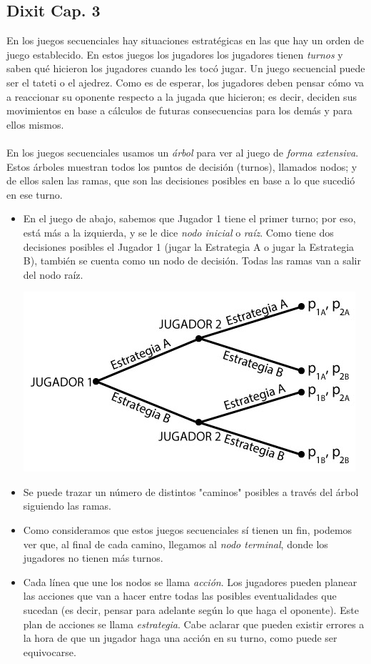 \documentclass{article}
\begin{document}
    \subsection*{\textbf{Dixit Cap. 3}}
        En los juegos secuenciales hay situaciones estratégicas en las que hay un orden de juego establecido. En estos juegos los jugadores los jugadores tienen \emph{turnos} y saben qué hicieron los jugadores cuando les tocó jugar. Un juego secuencial puede ser el tateti o el ajedrez. Como es de esperar, los jugadores deben pensar cómo va a reaccionar su oponente respecto a la jugada que hicieron; es decir, deciden sus movimientos en base a cálculos de futuras consecuencias para los demás y para ellos mismos.
        \\
        \\
        En los juegos secuenciales usamos un \emph{árbol} para ver al juego de \emph{forma extensiva}. Estos árboles muestran todos los puntos de decisión (turnos), llamados nodos; y de ellos salen las ramas, que son las decisiones posibles en base a lo que sucedió en ese turno.
            \begin{itemize}
                \item En el juego de abajo, sabemos que Jugador 1 tiene el primer turno; por eso, está más a la izquierda, y se le dice \emph{nodo inicial} o \emph{raíz}. Como tiene dos decisiones posibles el Jugador 1 (jugar la Estrategia A o jugar la Estrategia B), también se cuenta como un nodo de decisión. Todas las ramas van a salir del nodo raíz.
                \begin{center}
                    \includegraphics[width=0.5\linewidth]{figs/fig13.jpg}
                \end{center}
                \item Se puede trazar un número de distintos "caminos" posibles a través del árbol siguiendo las ramas.
                \item Como consideramos que estos juegos secuenciales sí tienen un fin, podemos ver que, al final de cada camino, llegamos al \emph{nodo terminal}, donde los jugadores no tienen más turnos.
                \item Cada línea que une los nodos se llama \emph{acción}. Los jugadores pueden planear las acciones que van a hacer entre todas las posibles eventualidades que sucedan (es decir, pensar para adelante según lo que haga el oponente). Este plan de acciones se llama \emph{estrategia}. Cabe aclarar que pueden existir errores a la hora de que un jugador haga una acción en su turno, como puede ser equivocarse.
            \end{itemize}
\end{document}
